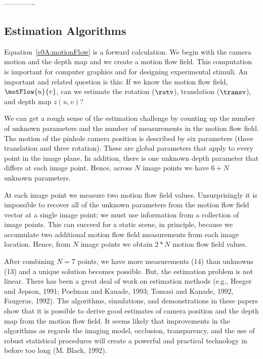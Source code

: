 -------------


\subsection*{Estimation Algorithms}
Equation~\ref{e9A:motionFlow} is a forward calculation.
We begin with the camera motion and the depth map and
we create a motion flow field.
This computation is important for computer graphics
and for designing experimental stimuli.
An important and related question is this:
If we know the motion flow field, $\motFlow{u}{v}$, 
can we estimate the rotation ($\rotv$),
translation ($\transv$), and depth map $z(u,v)$?

We can get a rough sense of the estimation challenge
by counting up the number of unknown parameters and
the number of measurements in the motion flow field.
The motion of the pinhole camera position
is described by six parameters (three translation
and three rotation).
These are global parameters that apply to every point
in the image plane.
In addition, there is one unknown depth parameter
that differs at each image point.
Hence, across $N$ image points we have $6 + N$ unknown parameters.

At each image point
we measure two motion flow field values.
Unsurprisingly it is impossible to recover all
of the unknown parameters from the motion flow field vector
at a single image point;
we must use information
from a collection of image points.
This can succeed for a static scene, in principle,
because we accumulate two additional 
motion flow field measurements
from each image location.
Hence, from $N$ image points
we obtain $2*N$ motion flow field values.

After combining $N=7$ points,
we have more measurements (14) than unknowns (13)
and a unique solution becomes possible.
But, the estimation problem is not linear.
There has been a great deal of work on estimation methods
(e.g.,  Heeger and Jepson, 1991; Poelman and Kanade, 1993;
Tomasi and Kanade, 1992, Faugeras, 1992).
The algorithms, simulations, and demonstrations in these
papers show that it is possible
to derive good estimates of camera position
and the depth map from the motion flow field.
It seems likely
that improvements in the algorithms as regards
the imaging model, occlusion, transparency, 
and the use of robust statistical procedures
will create a powerful and practical technology in 
before too long  (M. Black, 1992).


